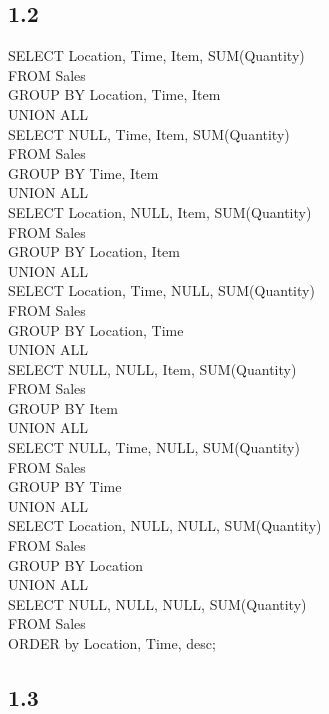 \documentclass[a4paper,12pt]{article}
\begin{document}
\subsection*{1.2}

\begin{large}
\begin{flushleft}
SELECT Location, Time, Item, SUM(Quantity)\\
FROM Sales\\
GROUP BY Location, Time, Item\\
UNION ALL\\
SELECT NULL, Time, Item, SUM(Quantity)\\
FROM Sales\\
GROUP BY Time, Item\\
UNION ALL\\
SELECT Location, NULL, Item, SUM(Quantity)\\
FROM Sales\\
GROUP BY Location, Item\\
UNION ALL\\
SELECT Location, Time, NULL, SUM(Quantity)\\
FROM Sales\\
GROUP BY Location, Time\\
UNION ALL\\
SELECT NULL, NULL, Item, SUM(Quantity)\\
FROM Sales\\
GROUP BY Item\\
UNION ALL\\
SELECT NULL, Time, NULL, SUM(Quantity)\\
FROM Sales\\
GROUP BY Time\\
UNION ALL\\
SELECT Location, NULL, NULL, SUM(Quantity)\\
FROM Sales\\
GROUP BY Location\\
UNION ALL\\
SELECT NULL, NULL, NULL, SUM(Quantity)\\
FROM Sales\\
ORDER by Location, Time, desc;\\

\end{flushleft}
\end{large}

\subsection*{1.3}
\end{document}
